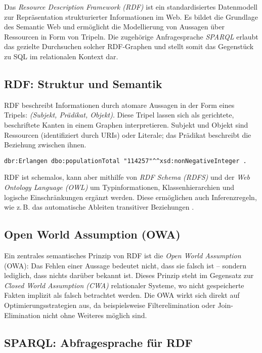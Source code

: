 \documentclass[12pt]{article}
\begin{document}
Das \textit{Resource Description Framework (RDF)} ist ein standardisiertes Datenmodell zur Repräsentation strukturierter Informationen im Web. Es bildet die Grundlage des Semantic Web und ermöglicht die Modellierung von Aussagen über Ressourcen in Form von Tripeln. Die zugehörige Anfragesprache \textit{SPARQL} erlaubt das gezielte Durchsuchen solcher RDF-Graphen und stellt somit das Gegenstück zu SQL im relationalen Kontext dar.

\subsection{RDF: Struktur und Semantik}

RDF beschreibt Informationen durch atomare Aussagen in der Form eines Tripels: \textit{(Subjekt, Prädikat, Objekt)}. Diese Tripel lassen sich als gerichtete, beschriftete Kanten in einem Graphen interpretieren. Subjekt und Objekt sind Ressourcen (identifiziert durch URIs) oder Literale; das Prädikat beschreibt die Beziehung zwischen ihnen.

\begin{lstlisting}[caption=Beispielhafte RDF-Repräsentation einer Einwohnerzahl]
dbr:Erlangen dbo:populationTotal "114257"^^xsd:nonNegativeInteger .
\end{lstlisting}

RDF ist schemalos, kann aber mithilfe von \textit{RDF Schema (RDFS)} und der \textit{Web Ontology Language (OWL)} um Typinformationen, Klassenhierarchien und logische Einschränkungen ergänzt werden. Diese ermöglichen auch Inferenzregeln, wie z.\,B. das automatische Ableiten transitiver Beziehungen \cite{antonellini2015owl}.

\subsection{Open World Assumption (OWA)}

Ein zentrales semantisches Prinzip von RDF ist die \textit{Open World Assumption} (OWA): Das Fehlen einer Aussage bedeutet nicht, dass sie falsch ist – sondern lediglich, dass nichts darüber bekannt ist. Dieses Prinzip steht im Gegensatz zur \textit{Closed World Assumption (CWA)} relationaler Systeme, wo nicht gespeicherte Fakten implizit als falsch betrachtet werden. Die OWA wirkt sich direkt auf Optimierungsstrategien aus, da beispielsweise Filterelimination oder Join-Elimination nicht ohne Weiteres möglich sind.

\subsection{SPARQL: Abfragesprache für RDF}
\end{document}
